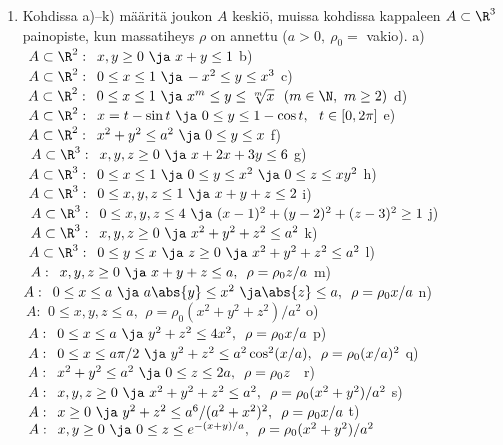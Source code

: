 \begin{enumerate}
\item
Kohdissa a)--k) määritä joukon $A$ keskiö, muissa kohdissa kappaleen $A\subset\R^3$ painopiste,
kun massatiheys $\rho$ on annettu ($a>0,\ \rho_0=$ vakio). \vspace{1mm}\newline
a) \ $\ A\subset\R^2:\,\ x,y \ge 0\ \ja\ x+y \le 1$ \newline
b) \ $\ A\subset\R^2:\,\ 0 \le x \le 1\ \ja\,-x^2 \le y \le x^3$ \newline
c) \ $\ A\subset\R^2:\,\ 0 \le x \le 1\ \ja\ x^m \le y \le \sqrt[m]{x}\ \ (m\in\N,\ m \ge 2)$
\newline
d) \ $\ A\subset\R^2:\,\ x=t-\sin t\ \ja\ 0 \le y \le 1-\cos t,\ \ t\in[0,2\pi]$ \newline
e) \ $\ A\subset\R^2:\,\ x^2+y^2 \le a^2\ \ja\ 0 \le y \le x$ \newline
f) \ $\,\ A\subset\R^3:\,\ x,y,z \ge 0\ \ja\ x+2x+3y \le 6$ \newline
g) \ $\ A\subset\R^3:\,\ 0 \le x \le 1\ \ja\ 0 \le y \le x^2\ \ja\ 0 \le z \le xy^2$ \newline
h) \ $\ A\subset\R^3:\,\ 0 \le x,y,z \le 1\ \ja\ x+y+z \le 2$ \newline
i) \ $\,\ A\subset\R^3:\,\ 0 \le x,y,z \le 4\ \ja\ (x-1)^2+(y-2)^2+(z-3)^2 \ge 1$ \newline
j) \ $\,\ A\subset\R^3:\,\ x,y,z \ge 0\ \ja\ x^2+y^2+z^2 \le a^2$ \newline
k) \ $\ A\subset\R^3:\,\ 0 \le y \le x\ \ja\ z \ge 0\ \ja\ x^2+y^2+z^2 \le a^2$ \newline
l) \ $\,\ A:\,\ x,y,z \ge 0\ \ja\ x+y+z \le a,\,\ \rho=\rho_0 z/a$ \newline
m) \ $A:\,\ 0 \le x \le a \ \ja\ a\abs{y} \le x^2\ \ja \abs{z} \le a,\,\ \rho=\rho_0 x/a$ 
\newline
n) \ $\ A:\,\ 0 \le x,y,z \le a,\,\ \rho=\rho_0(x^2+y^2+z^2)/a^2$ \newline
o) \ $\ A:\,\ 0 \le x \le a\ \ja\ y^2+z^2 \le 4x^2,\,\ \rho=\rho_0 x/a$ \newline
p) \ $\ A:\,\ 0 \le x \le a\pi/2\ \ja\ y^2+z^2 \le a^2\cos^2(x/a),\,\ \rho=\rho_0 (x/a)^2$
\newline
q) \ $\ A:\,\ x^2+y^2 \le a^2\ \ja\ 0 \le z \le 2a,\,\ \rho=\rho_0 z$ \newline
r) \ $\ A:\,\ x,y,z \ge 0\ \ja\ x^2+y^2+z^2 \le a^2,\,\ \rho=\rho_0 (x^2+y^2)/a^2$ \newline
s) \ $\ A:\,\ x \ge 0\ \ja\ y^2+z^2 \le a^6/(a^2+x^2)^2,\,\ \rho=\rho_0 x/a$ \newline
t) \ $\ A:\,\ x,y \ge 0\ \ja\ 0 \le z \le e^{-(x+y)/a},\,\ \rho=\rho_0(x^2+y^2)/a^2$


\end{enumerate}

